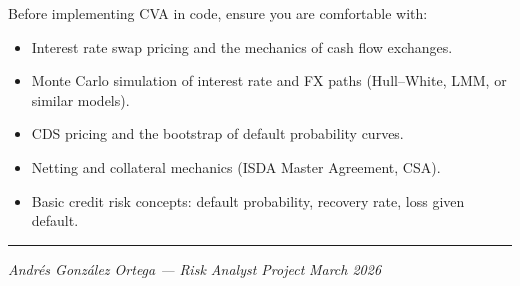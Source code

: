 \documentclass[11pt, a4paper]{article}
\theoremstyle{definition}
\theoremstyle{plain}
\theoremstyle{remark}
\begin{document}
\begin{prereq}
Before implementing CVA in code, ensure you are comfortable with:
\begin{itemize}
    \item Interest rate swap pricing and the mechanics of cash flow exchanges.
    \item Monte Carlo simulation of interest rate and FX paths
          (Hull--White, LMM, or similar models).
    \item CDS pricing and the bootstrap of default probability curves.
    \item Netting and collateral mechanics (ISDA Master Agreement, CSA).
    \item Basic credit risk concepts: default probability, recovery rate, loss given default.
\end{itemize}
\end{prereq}

\vfill
\hrule
\smallskip
\noindent\textit{Andr\'es Gonz\'alez Ortega --- Risk Analyst Project} \hfill \textit{March 2026}
\end{document}
